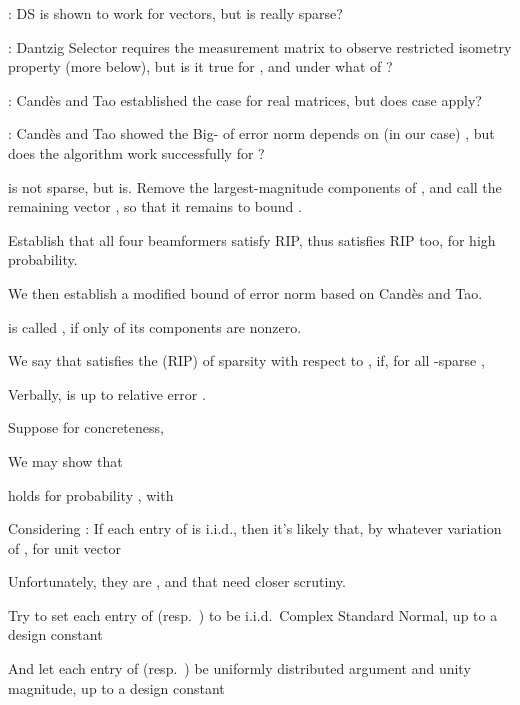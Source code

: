 {
\I {}: DS is shown to work for  vectors, but is  really sparse?

\I {}: Dantzig Selector requires the measurement matrix to observe restricted isometry property (more below), but is it true for , and under what  of ?

\I {}: Candès and Tao established the case for real matrices, but does  case apply?

\I {}: Candès and Tao showed the Big- of error norm depends on (in our case) , but does the algorithm work successfully for ?
}
{
\I {} is not sparse, but  is.
Remove the largest-magnitude  components of , and call the remaining vector , so that it remains to bound .

\I Establish that all four beamformers satisfy RIP, thus  satisfies RIP too, for high probability.

\I We then establish a modified bound of error norm based on Candès and Tao.
}
{
\I {} is called , if only  of its components are nonzero.

\I We say that  satisfies the  (RIP) of sparsity  with respect to , if, for all -sparse ,

\I Verbally,  is  up to relative error .
}
{
\I Suppose for concreteness,

\I We may show that 

\I holds for probability , with
}
{
\I Considering : If each entry of  is i.i.d., then it's likely that, by whatever variation of , for unit vector 

\I Unfortunately, they are , and that need closer scrutiny.

\I Try to set each entry of  (resp.\ ) to be i.i.d.\ Complex Standard Normal, up to a design constant

\I And let each entry of  (resp.\ ) be uniformly distributed argument and unity magnitude, up to a design constant
}
